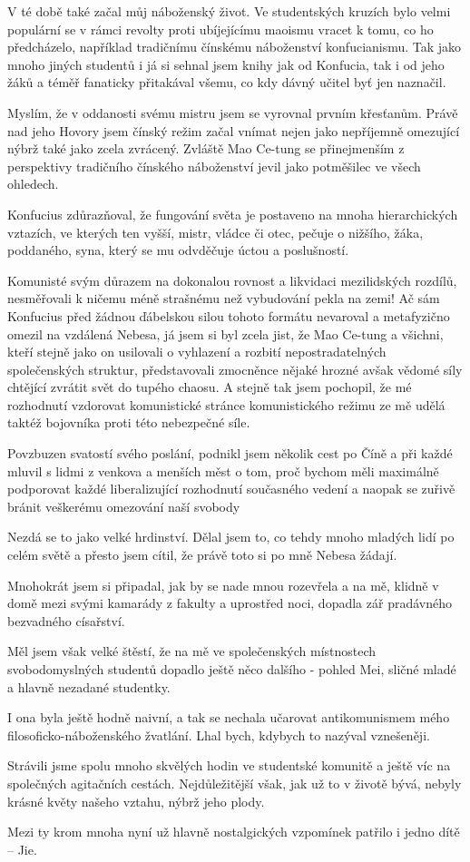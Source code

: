 V té době také začal můj náboženský život. Ve studentských kruzích bylo velmi populární se v rámci revolty proti ubíjejícímu maoismu vracet k tomu, co ho předcházelo, například tradičnímu čínskému náboženství konfucianismu. Tak jako mnoho jiných studentů i já si sehnal jsem knihy jak od Konfucia, tak i od jeho žáků a téměř fanaticky přitakával všemu, co kdy dávný učitel byť jen naznačil.	

Myslím, že v oddanosti svému mistru jsem se vyrovnal prvním křesťanům. Právě nad jeho Hovory jsem čínský režim začal vnímat nejen jako nepříjemně omezující nýbrž také jako zcela zvrácený.
Zvláště Mao Ce-tung se přinejmenším z perspektivy tradičního čínského náboženství jevil jako potměšilec ve všech ohledech.

Konfucius zdůrazňoval, že fungování světa je postaveno na mnoha hierarchických vztazích, ve kterých ten vyšší, mistr, vládce či otec, pečuje o nižšího, žáka, poddaného, syna, který se mu odvděčuje úctou a poslušností.

Komunisté svým důrazem na dokonalou rovnost a likvidaci mezilidských rozdílů, nesměřovali k ničemu méně strašnému než vybudování pekla na zemi! Ač sám Konfucius před žádnou ďábelskou silou tohoto formátu nevaroval a metafyzično omezil na vzdálená Nebesa, já jsem si byl zcela jist, že Mao Ce-tung a všichni, kteří stejně jako on usilovali o vyhlazení a rozbití nepostradatelných společenských struktur, představovali zmocněnce nějaké hrozné avšak vědomé síly chtějící zvrátit svět do tupého chaosu.
A stejně tak jsem pochopil, že mé rozhodnutí vzdorovat komunistické stránce komunistického režimu ze mě udělá taktéž bojovníka proti této nebezpečné síle. 

Povzbuzen svatostí svého poslání, podnikl jsem několik cest po Číně a při každé mluvil s lidmi z venkova a menších měst o tom, proč bychom měli maximálně podporovat každé liberalizující rozhodnutí současného vedení a naopak se zuřivě bránit veškerému omezování naší svobody

Nezdá se to jako velké hrdinství. Dělal jsem to, co tehdy mnoho mladých lidí po celém světě a přesto jsem cítil, že právě toto si po mně Nebesa žádají.

Mnohokrát jsem si připadal, jak by se nade mnou rozevřela a na mě, klidně v domě mezi svými kamarády z fakulty a uprostřed noci, dopadla zář pradávného bezvadného císařství.

Měl jsem však velké štěstí, že na mě ve společenských místnostech svobodomyslných studentů dopadlo ještě něco dalšího - pohled Mei, sličné mladé a hlavně nezadané studentky.

I ona byla ještě hodně naivní, a tak se nechala učarovat antikomunismem mého filosoficko-náboženského žvatlání. Lhal bych, kdybych to nazýval vznešeněji.

Strávili jsme spolu mnoho skvělých hodin ve studentské komunitě a ještě víc na společných agitačních cestách. Nejdůležitější však, jak už to v životě bývá, nebyly krásné květy našeho vztahu, nýbrž jeho plody.

Mezi ty krom mnoha nyní už hlavně nostalgických vzpomínek patřilo i jedno dítě – Jie.
